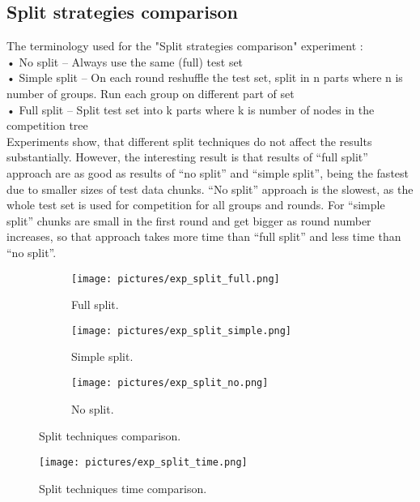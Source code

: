 \documentclass{scrartcl}
\begin{document}
\subsection{Split strategies comparison}
The terminology used for the "Split strategies comparison" experiment : \\
•	No split – Always use the same (full) test set \\
•	Simple split – On each round reshuffle the test set, split in n parts where n is number of groups. Run each group on different part of set\\
•	Full split – Split test set into k parts where k is number of nodes in the competition tree\\
Experiments show, that different split techniques do not affect the results substantially.  However, the interesting result is that results of “full split” approach are as good as results of “no split” and “simple split”, being the fastest due to smaller sizes of test data chunks. “No split” approach is the slowest, as the whole test set is used for competition for all groups and rounds. For “simple split” chunks are small in the first round and get bigger as round number increases, so that approach takes more time than “full split” and less time than “no split”.

\begin{figure}[H]
  \centering
  \begin{subfigure}[b]{0.45\linewidth}
    \texttt{[image: pictures/exp\_split\_full.png]}
    \caption{Full split.}
  \end{subfigure}\hfill%
  \begin{subfigure}[b]{0.45\linewidth}
    \texttt{[image: pictures/exp\_split\_simple.png]}
    \caption{Simple split.}
  \end{subfigure}
    \begin{subfigure}[b]{0.45\linewidth}
    \texttt{[image: pictures/exp\_split\_no.png]}
    \caption{No split.}
  \end{subfigure}
  \caption{Split techniques comparison.}
  \label{fig:splits}
\end{figure}

\begin{figure}[H]
  \begin{center}
  \texttt{[image: pictures/exp\_split\_time.png]}
    \end{center}
  \caption{Split techniques time comparison.}
  \label{fig:splits_time}
\end{figure}
\end{document}
